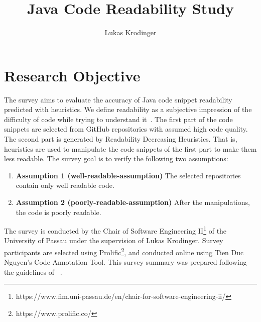 \documentclass[%
class=scrreprt,
chapterprefix=false,%
open=right,%
twoside=false,%
paper=a4,%
logofile={Logo\_zentral\_farbig\_EN.png},%
thesistype=masterproposal,%
UKenglish,%
]{se2thesis}
\author{Lukas Krodinger}
\title{Java Code Readability Study}
\institute{Chair of Software Engineering II}
\begin{document}
	
	\frontmatter
	
	\maketitle
	
	\mainmatter
	
\section{Research Objective}
The survey aims to evaluate the accuracy of Java code snippet readability predicted with heuristics.
We define readability as a subjective impression of the difficulty of code while trying to understand it~\cite{posnett2011simpler, buse2009learning}.
The first part of the code snippets are selected from GitHub repositories with assumed high code quality.
The second part is generated by Readability Decreasing Heuristics. That is, heuristics are used to manipulate the code snippets of the first part to make them less readable.
The survey goal is to verify the following two assumptions:
\begin{enumerate}
	\item \label{well-readable-assumption} \textbf{Assumption 1 (well-readable-assumption)} The selected repositories contain only well readable code.
	\item \label{poorly-readable-assumption} \textbf{Assumption 2 (poorly-readable-assumption)} After the manipulations, the code is poorly readable.
\end{enumerate}

The survey is conducted by the Chair of Software Engineering II\footnote{https://www.fim.uni-passau.de/en/chair-for-software-engineering-ii/} of the University of Passau under the supervision of Lukas Krodinger.
Survey participants are selected using Prolific\footnote{https://www.prolific.co/}, and conducted online using Tien Duc Nguyen's Code Annotation Tool. This survey summary was prepared following the guidelines of \citeauthor{linaker2015guidelines}~\cite{linaker2015guidelines}.
\end{document}
